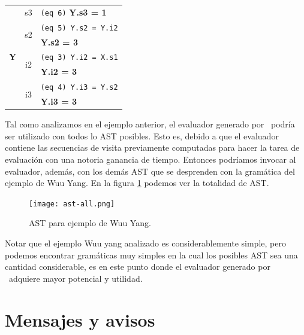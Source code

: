 \begin{center}
\begin{tabular}{|| c | c | l ||}
\multirow{7}{*}{\textbf{Y}} &                  s3 & \texttt{(eq 6)} \textbf{Y.s3 = 1} \\ \cline{2-3}
                           & \multirow{2}{*}{s2} &    \texttt{(eq 5) Y.s2 = Y.i2} \\
                           &                     & \textbf{Y.s2 = 3} \\ \cline{2-3}
                           & \multirow{2}{*}{i2} & \texttt{(eq 3) Y.i2 = X.s1} \\
                           &                     & \textbf{Y.i2 = 3} \\ \cline{2-3}
                           & \multirow{2}{*}{i3} & \texttt{(eq 4) Y.i3 = Y.s2} \\
                           &                     & \textbf{Y.i3 = 3} \\
\hline \hline
\end{tabular}\end{center}

Tal como analizamos en el ejemplo anterior, el evaluador generado por \maggen\ podría ser utilizado con todos lo AST posibles. Esto es, debido a que el evaluador contiene las secuencias de visita previamente computadas para hacer la tarea de evaluación con una notoria ganancia de tiempo. Entonces podríamos invocar al evaluador, además, con los demás AST que se desprenden con la gramática del ejemplo de Wuu Yang. En la figura \ref{fig:allast} podemos ver la totalidad de AST.

\begin{figure}[h!]\centering
\texttt{[image: ast-all.png]}
\caption{\label{fig:allast} AST para ejemplo de Wuu Yang.}
\end{figure}

Notar que el ejemplo Wuu yang analizado es considerablemente simple, pero podemos encontrar gramáticas muy simples en la cual los posibles AST sea una cantidad considerable, es en este punto donde el evaluador generado por \maggen\ adquiere mayor potencial y utilidad.

\section{Mensajes y avisos}

